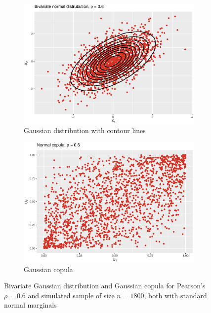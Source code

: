  \begin{figure}[H]
\centering
\begin{subfigure}{.45\textwidth}
  \centering
  \includegraphics[width=\linewidth]{figures/bivariate_normal.eps}
  \caption{Gaussian distribution with contour lines}
  \label{fig:mvd_normal_copula}
\end{subfigure}
\begin{subfigure}{.45\textwidth}
  \centering
  \includegraphics[width=\linewidth]{figures/normal_copula.eps}
  \caption{Gaussian copula}
  \label{fig:normal_copula}
\end{subfigure}
\caption{Bivariate Gaussian distribution and Gaussian copula for Pearson's $\rho = 0.6$ and simulated sample of size $n = 1800$, both with standard normal marginals}
\label{fig:normal_plots}
\end{figure}






